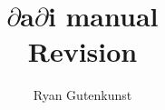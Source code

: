\documentclass{report}
\newcommand{\dadi}{$\partial$a$\partial$i\xspace}
\begin{document}
\title{\dadi manual\\\normalsize  $ $Revision$ $}
\author{Ryan Gutenkunst}
\maketitle
\end{document}
